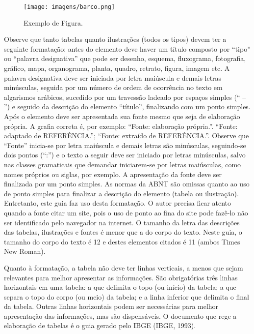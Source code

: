 \begin{enumerate}[label=\alph*)]
\begin{figure}[htbp]
    \caption{Exemplo de Figura.}
	\centering
		\texttt{[image: imagens/barco.png]}
	\label{fig:barco}
\end{figure}

Observe que tanto tabelas quanto ilustrações (todos os tipos) devem ter a seguinte formatação: antes do elemento deve haver um título composto por “tipo” ou “palavra designativa” que pode ser desenho, esquema, fluxograma, fotografia, gráfico, mapa, organograma, planta, quadro, retrato, figura, imagem etc. A palavra designativa deve ser iniciada por letra maiúscula e demais letras minúsculas, seguida por um número de ordem de ocorrência no texto em algarismos arábicos, sucedido por um travessão ladeado por espaços simples (“ – ”) e seguido da descrição do elemento “título”, finalizando com um ponto simples. Após o elemento deve ser apresentada sua fonte mesmo que seja de elaboração própria. A grafia correta é, por exemplo: “Fonte: elaboração própria.”. “Fonte: adaptado de REFERÊNCIA.”; “Fonte: extraído de REFERÊNCIA.”. Observe que “Fonte” inicia-se por letra maiúscula e demais letras são minúsculas, seguindo-se dois pontos (“:”) e o texto a seguir deve ser iniciado por letras minúsculas, salvo nas classes gramaticais que demandar iniciarem-se por letras maiúsculas, como nomes próprios ou siglas, por exemplo. A apresentação da fonte deve ser finalizada por um ponto simples. As normas da ABNT são omissas quanto ao uso de ponto simples para finalizar a descrição do elemento (tabela ou ilustração). Entretanto, este guia faz uso desta formatação. O autor precisa ficar atento quando a fonte citar um site, pois o uso de ponto ao fina do site pode fazê-lo não ser identificado pelo navegador na internet. O tamanho da letra das descrições das tabelas, ilustrações e fontes é menor que a do corpo do texto. Neste guia, o tamanho do corpo do texto é 12 e destes elementos citados é 11 (ambos Times New Roman).

Quanto à formatação, a tabela não deve ter linhas verticais, a menos que sejam relevantes para melhor apresentar as informações. São obrigatórias três linhas horizontais em uma tabela: a que delimita o topo (ou início) da tabela; a que separa o topo do corpo (ou meio) da tabela; e a linha inferior que delimita o final da tabela. Outras linhas horizontais podem ser necessárias para melhor apresentação das informações, mas são dispensáveis. O documento que rege a elaboração de tabelas é o guia gerado pelo IBGE (IBGE, 1993).


\end{enumerate}
